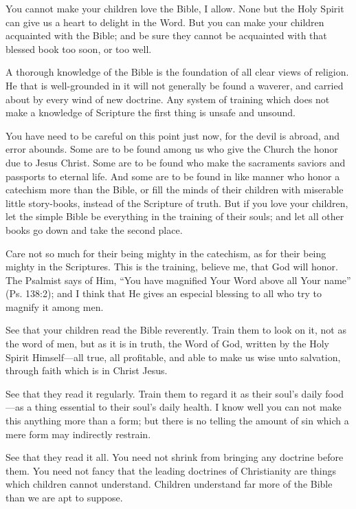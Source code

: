\documentclass[
]{book}
\begin{document}
You cannot make your children love the Bible, I allow. None but the Holy Spirit can give us a heart to delight in the Word. But you can make your children acquainted with the Bible; and be sure they cannot be acquainted with that blessed book too soon, or too well.

A thorough knowledge of the Bible is the foundation of all clear views of religion. He that is well-grounded in it will not generally be found a waverer, and carried about by every wind of new doctrine. Any system of training which does not make a knowledge of Scripture the first thing is unsafe and unsound.

You have need to be careful on this point just now, for the devil is abroad, and error abounds. Some are to be found among us who give the Church the honor due to Jesus Christ. Some are to be found who make the sacraments saviors and passports to eternal life. And some are to be found in like manner who honor a catechism more than the Bible, or fill the minds of their children with miserable little story-books, instead of the Scripture of truth. But if you love your children, let the simple Bible be everything in the training of their souls; and let all other books go down and take the second place.

Care not so much for their being mighty in the catechism, as for their being mighty in the Scriptures. This is the training, believe me, that God will honor. The Psalmist says of Him, ``You have magnified Your Word above all Your name'' (Ps. 138:2); and I think that He gives an especial blessing to all who try to magnify it among men.

See that your children read the Bible reverently. Train them to look on it, not as the word of men, but as it is in truth, the Word of God, written by the Holy Spirit Himself---all true, all profitable, and able to make us wise unto salvation, through faith which is in Christ Jesus.

See that they read it regularly. Train them to regard it as their soul's daily food---as a thing essential to their soul's daily health. I know well you can not make this anything more than a form; but there is no telling the amount of sin which a mere form may indirectly restrain.

See that they read it all. You need not shrink from bringing any doctrine before them. You need not fancy that the leading doctrines of Christianity are things which children cannot understand. Children understand far more of the Bible than we are apt to suppose.
\end{document}
